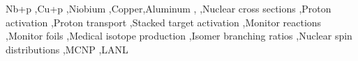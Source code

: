 \documentclass[3p]{elsarticle}
\newcommand{\comment}[1]{\todo[color=blue!20!white,inline]{ASV: #1}}
\begin{document}
\begin{frontmatter}
\begin{abstract}





\end{abstract}

\begin{keyword}
Nb+p \sep Cu+p \sep Niobium \sep Copper\sep Aluminum \sep {}  \sep Nuclear cross sections \sep Proton activation \sep Proton transport \sep Stacked target activation \sep Monitor reactions \sep Monitor foils \sep Medical isotope production \sep Isomer branching ratios \sep Nuclear spin distributions  \sep MCNP \sep  LANL


\end{keyword}

\end{frontmatter}
\end{document}
